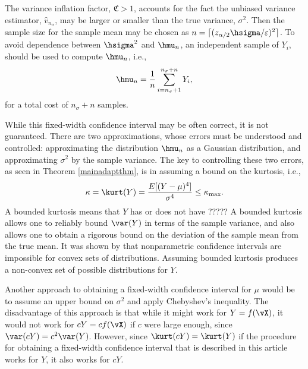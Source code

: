 \documentclass[graybox]{svmult}
\newcommand{\hv}{\hat{v}}
\newcommand{\fudge}{\mathfrak{C}}
\begin{document}
The variance inflation factor, $\fudge>1$, accounts for the fact the unbiased variance estimator, $\hv_{n_{\sigma}}$, may be larger or smaller than the true variance, $\sigma^2$.  Then the sample size for the sample mean may be chosen as $n=\lceil (z_{\alpha/2}\hsigma/\varepsilon)^2\rceil$.  To avoid dependence between $\hsigma^2$ and $\hmu_n$, an independent sample of $Y_i$, should be used to compute $\hmu_n$, i.e., 
\begin{equation} \label{simpleMCest}
\hmu_n = \frac 1n \sum_{i=n_{\sigma}+1}^{n_{\sigma}+n} Y_i,
\end{equation}
for a total cost of $n_{\sigma}+n$ samples.

While this fixed-width confidence interval may be often correct, it is not guaranteed. There are two approximations, whose errors must be understood and controlled: approximating the distribution $\hmu_n$ as a Gaussian distribution, and approximating $\sigma^2$ by the sample variance.  The key to controlling these two errors, as seen in Theorem \ref{mainadaptthm}, is in assuming a bound on the kurtosis, i.e., 
\begin{equation} \label{boundedkurt}
\kappa=\kurt(Y) = \frac{E[(Y-\mu)^4]}{\sigma^4} \le \kappa_{\max}.
\end{equation}
A bounded kurtosis means that $Y$ has or does not have ????? A bounded kurtosis allows one to reliably bound $\var(Y)$ in terms of the sample variance, and also allows one to obtain a rigorous bound on the deviation of the sample mean from the true mean.  It was shown by \cite[Corollary 2]{BahSav56} that nonparametric confidence intervals are impossible for convex sets of distributions. Assuming bounded kurtosis produces a non-convex set of possible distributions for $Y$.

Another approach to obtaining a fixed-width confidence interval for $\mu$ would be to assume an upper bound on $\sigma^2$ and apply Chebyshev's inequality.  The disadvantage of this approach is that while it might work for $Y=f(\vX)$, it would not work for $cY=cf(\vX)$ if $c$ were large enough, since $\var(cY)=c^2 \var(Y)$.  However, since $\kurt(cY)=\kurt(Y)$ if the procedure for obtaining a fixed-width confidence interval that is described in this article works for $Y$, it also works for $cY$.
\end{document}
